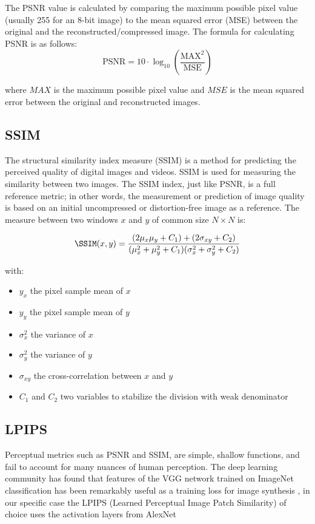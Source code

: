   The PSNR value is calculated by comparing the maximum possible pixel value (usually 255 for an 8-bit image) to the mean squared error (MSE) between the original and the reconstructed/compressed image. The formula for calculating PSNR is as follows:
  \[
  \text{PSNR} = 10 \cdot \log_{10}\left(\frac{\text{MAX}^2}{\text{MSE}}\right)
  \]

  where \(MAX\) is the maximum possible pixel value and \(MSE\) is the mean squared error between the original and reconstructed images.

\subsection{SSIM}
\label{subsec:ssim}
  The structural similarity index measure (SSIM\cite{ssim}) is a method for predicting the perceived quality of digital images and videos. SSIM is used for measuring the similarity between two images. The SSIM index, just like PSNR, is a full reference metric; in other words, the measurement or prediction of image quality is based on an initial uncompressed or distortion-free image as a reference. The measure between two windows \(x\) and \(y\) of common size \(N \times N\) is:


  \begin{equation}
    \SSIM(x,y) = \frac{(2\mu_x\mu_y + C_1) + (2 \sigma _{xy} + C_2)}
      {(\mu_x^2 + \mu_y^2+C_1) (\sigma_x^2 + \sigma_y^2+C_2)}
    \label{eq:SSMI}
  \end{equation}

  with:
  \begin{itemize}
    \itemsep0em
    \item \(y_x\) the pixel sample mean of \(x\)
    \item \(y_y\) the pixel sample mean of \(y\)
    \item \(\sigma_x^2\) the variance of \(x\)
    \item \(\sigma_y^2\) the variance of \(y\)
    \item \(\sigma _{xy}\) the cross-correlation between \(x\) and \(y\)
    \item \(C_1\) and \(C_2\) two variables to stabilize the division with weak denominator
  \end{itemize}

\subsection{LPIPS}
\label{subsec:LPIPS}
  Perceptual metrics such as PSNR and SSIM, are simple, shallow functions, and fail to account for many nuances of human perception. The deep learning community has found that features
  of the VGG network trained on ImageNet classification has
  been remarkably useful as a training loss for image synthesis \cite{zhang2018unreasonable}, in our specific case the LPIPS (Learned Perceptual Image Patch Similarity) of choice uses the activation layers from AlexNet \cite{NIPS2012_c399862d}


